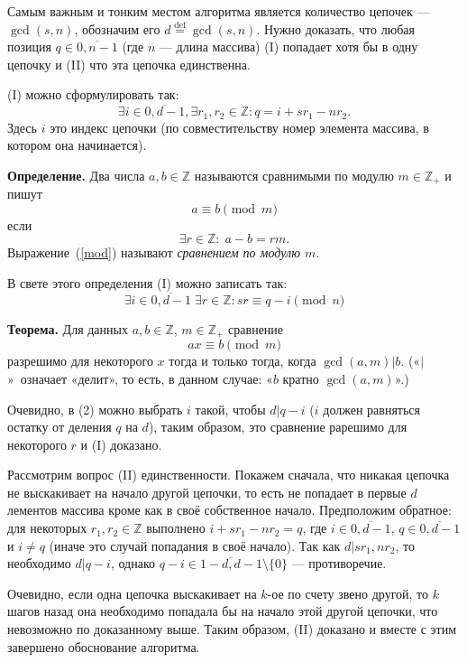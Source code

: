 \documentclass{article}
\begin{document}
Самым важным и тонким местом алгоритма является количество цепочек —
$\gcd(s,n)$, обозначим его $d\stackrel{\text{def}}{=}\gcd(s,n)$. Нужно доказать,
что любая позиция $q\in\overline{0,n-1}$ (где $n$ — длина массива) (I) попадает
хотя бы в одну цепочку и (II) что эта цепочка единственна.

(I) можно сформулировать так:
$$\exists i\in\overline{0, d-1}, \exists r_1,r_2\in \mathbb Z: q = i +
sr_1 - nr_2.$$ Здесь $i$ это индекс цепочки (по совместительству номер элемента
массива, в котором она начинается).

{\bf Определение.} Два числа $a,b\in \mathbb Z$ называются сравнимыми по
модулю $m\in\mathbb Z_+$ и пишут \begin{equation}\label{mod}a\equiv b\pmod
m\end{equation} если $$
\exists r\in\mathbb Z:\; a - b = rm.
$$ Выражение~(\ref{mod}) называют {\em сравнением по модулю $m$}.

В свете этого определения (I) можно записать так:
\begin{equation}
\exists i\in\overline{0, d-1}\; \exists r\in \mathbb Z:
sr \equiv q - i\pmod n
\end{equation}

{\bf Теорема.} Для данных $a,b\in \mathbb Z$, $m\in \mathbb Z_+$ сравнение
$$ax\equiv b \pmod m$$
разрешимо для некоторого $x$ тогда и только тогда, когда $\gcd(a,m)|b$.
(«$|$»~означает «делит», то есть, в данном случае: «$b$ кратно $\gcd(a,m)$».)

Очевидно, в (2) можно выбрать $i$ такой, чтобы $d|q-i$ ($i$ должен равняться 
остатку от деления $q$ на $d$), таким образом, это сравнение рарешимо для
некоторого $r$ и (I) доказано.

Рассмотрим вопрос (II) единственности. Покажем сначала, что никакая цепочка не
выскакивает на начало другой цепочки, то есть не попадает в первые $d$
лементов массива кроме как в своё собственное начало. Предположим обратное: для
некоторых $r_1,r_2\in \mathbb Z$ выполнено $i+sr_1 - nr_2=q$, где
$i\in\overline{0,d-1}$, $q\in\overline{0,d-1}$ и $i\neq q$ (иначе это случай
попадания в своё начало). Так как $d|sr_1, nr_2$, то необходимо $d|q-i$, однако
$q-i\in\overline{1-d, d-1}\setminus\{0\}$ — противоречие.

Очевидно, если одна цепочка выскакивает на $k$-ое по счету звено другой,
то $k$ шагов назад она необходимо попадала бы на начало этой другой цепочки,
что невозможно по доказанному выше. Таким образом, (II) доказано и
вместе с этим завершено обоснование алгоритма.
\end{document}
